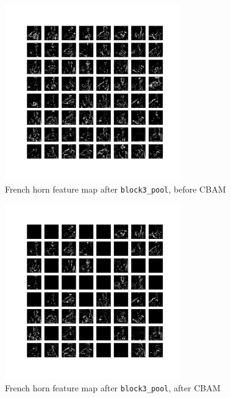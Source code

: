 \documentclass{article}
\begin{document}
\begin{appendices}
\begin{figure}[H]
    \centering
    \includegraphics[width=3in]{csci-8920/hw-4/images/horn-pre-CBAM-10-block3_pool.png}
    \caption{French horn feature map after \lstinline{block3_pool}, before CBAM}
    \label{fig:horn_3_post}
\end{figure}
\begin{figure}[H]
    \centering
    \includegraphics[width=3in]{csci-8920/hw-4/images/horn-post-CBAM-10-block3_pool.png}
    \caption{French horn feature map after \lstinline{block3_pool}, after CBAM}
    \label{fig:horn_4_pre}
\end{figure}


\end{appendices}
\end{document}
